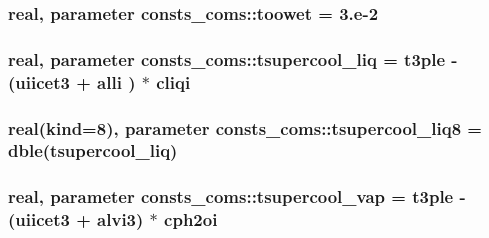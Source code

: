 \subsubsection[{\texorpdfstring{toowet}{toowet}}]{\setlength{\rightskip}{0pt plus 5cm}real, parameter consts\+\_\+coms\+::toowet = 3.e-\/2}\hypertarget{namespaceconsts__coms_a2f92e5b6f096a28a59849a98a0cb18bf}{}\label{namespaceconsts__coms_a2f92e5b6f096a28a59849a98a0cb18bf}
\subsubsection[{\texorpdfstring{tsupercool\+\_\+liq}{tsupercool_liq}}]{\setlength{\rightskip}{0pt plus 5cm}real, parameter consts\+\_\+coms\+::tsupercool\+\_\+liq = {\bf t3ple} -\/ ({\bf uiicet3} + {\bf alli} ) $\ast$ {\bf cliqi}}\hypertarget{namespaceconsts__coms_ae511d0736cb1c546c00927c132cf9c9b}{}\label{namespaceconsts__coms_ae511d0736cb1c546c00927c132cf9c9b}
\subsubsection[{\texorpdfstring{tsupercool\+\_\+liq8}{tsupercool_liq8}}]{\setlength{\rightskip}{0pt plus 5cm}real(kind=8), parameter consts\+\_\+coms\+::tsupercool\+\_\+liq8 = dble({\bf tsupercool\+\_\+liq})}\hypertarget{namespaceconsts__coms_a2c9885214fcc467cea34fbde9e860607}{}\label{namespaceconsts__coms_a2c9885214fcc467cea34fbde9e860607}
\subsubsection[{\texorpdfstring{tsupercool\+\_\+vap}{tsupercool_vap}}]{\setlength{\rightskip}{0pt plus 5cm}real, parameter consts\+\_\+coms\+::tsupercool\+\_\+vap = {\bf t3ple} -\/ ({\bf uiicet3} + {\bf alvi3}) $\ast$ {\bf cph2oi}}\hypertarget{namespaceconsts__coms_a3872bd8b82e199fef7eb05add79a9a17}{}\label{namespaceconsts__coms_a3872bd8b82e199fef7eb05add79a9a17}
